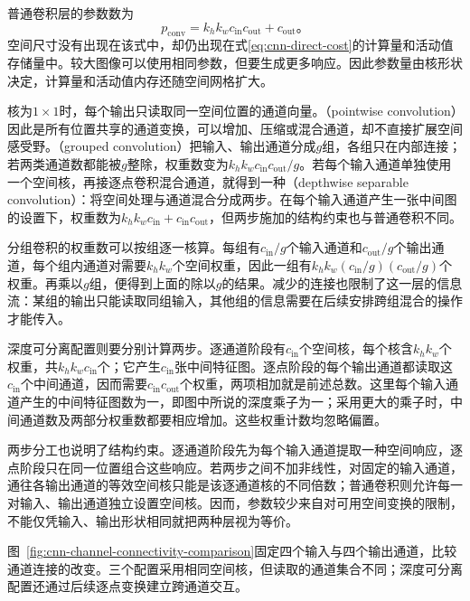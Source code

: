 普通卷积层的参数数为
\begin{equation}
  p_{\mathrm{conv}}=k_hk_wc_{\mathrm{in}}c_{\mathrm{out}}
                    +c_{\mathrm{out}}\text{。}
  \label{eq:cnn-layer-parameters}
\end{equation}
空间尺寸没有出现在该式中，却仍出现在式\eqref{eq:cnn-direct-cost}的计算量和活动值存储量中。较大图像可以使用相同参数，但要生成更多响应。因此参数量由核形状决定，计算量和活动值内存还随空间网格扩大。

核为$1\times1$时，每个输出只读取同一空间位置的通道向量。（pointwise convolution）因此是所有位置共享的通道变换，可以增加、压缩或混合通道，却不直接扩展空间感受野。（grouped convolution）把输入、输出通道分成$g$组，各组只在内部连接；若两类通道数都能被$g$整除，权重数变为$k_hk_wc_{\mathrm{in}}c_{\mathrm{out}}/g$。若每个输入通道单独使用一个空间核，再接逐点卷积混合通道，就得到一种（depthwise separable convolution）：将空间处理与通道混合分成两步。在每个输入通道产生一张中间图的设置下，权重数为$k_hk_wc_{\mathrm{in}}+c_{\mathrm{in}}c_{\mathrm{out}}$，但两步施加的结构约束也与普通卷积不同。

分组卷积的权重数可以按组逐一核算。每组有$c_{\mathrm{in}}/g$个输入通道和$c_{\mathrm{out}}/g$个输出通道，每个组内通道对需要$k_hk_w$个空间权重，因此一组有$k_hk_w(c_{\mathrm{in}}/g)(c_{\mathrm{out}}/g)$个权重。再乘以$g$组，便得到上面的除以$g$的结果。减少的连接也限制了这一层的信息流：某组的输出只能读取同组输入，其他组的信息需要在后续安排跨组混合的操作才能传入。

深度可分离配置则要分别计算两步。逐通道阶段有$c_{\mathrm{in}}$个空间核，每个核含$k_hk_w$个权重，共$k_hk_wc_{\mathrm{in}}$个；它产生$c_{\mathrm{in}}$张中间特征图。逐点阶段的每个输出通道都读取这$c_{\mathrm{in}}$个中间通道，因而需要$c_{\mathrm{in}}c_{\mathrm{out}}$个权重，两项相加就是前述总数。这里每个输入通道产生的中间特征图数为一，即图中所说的深度乘子为一；采用更大的乘子时，中间通道数及两部分权重数都要相应增加。这些权重计数均忽略偏置。

两步分工也说明了结构约束。逐通道阶段先为每个输入通道提取一种空间响应，逐点阶段只在同一位置组合这些响应。若两步之间不加非线性，对固定的输入通道，通往各输出通道的等效空间核只能是该逐通道核的不同倍数；普通卷积则允许每一对输入、输出通道独立设置空间核。因而，参数较少来自对可用空间变换的限制，不能仅凭输入、输出形状相同就把两种层视为等价。

图~\ref{fig:cnn-channel-connectivity-comparison}固定四个输入与四个输出通道，比较通道连接的改变。三个配置采用相同空间核，但读取的通道集合不同；深度可分离配置还通过后续逐点变换建立跨通道交互。

